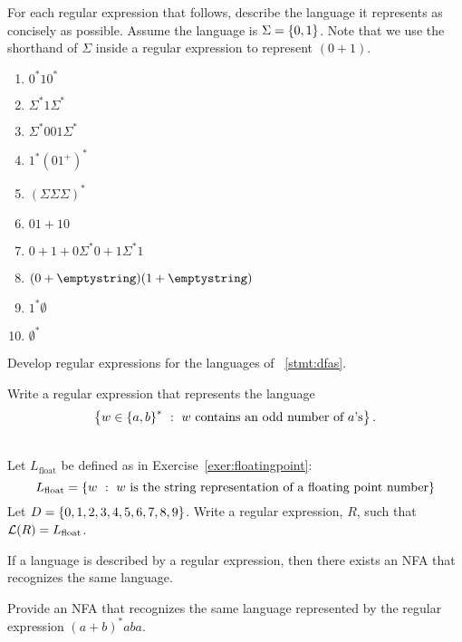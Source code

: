 \documentclass[twoside,letterpaper,openany]{book}
\begin{document}
\begin{exer2}
For each regular expression that follows, describe the language it represents as concisely as possible. Assume the language is $\Sigma = \left\lbrace 0, 1 \right\rbrace$. Note that we use the shorthand of $\Sigma$ inside a regular expression to represent $(0 + 1)$.
\begin{enumerate}
\item $0^*10^*$
\item $\Sigma^*1\Sigma^*$
\item $\Sigma^*001\Sigma^*$
\item $1^*(01^+)^*$
\item $(\Sigma\Sigma\Sigma)^*$
\item $01 + 10$
\item $0 + 1 + 0\Sigma^*0 + 1\Sigma^*1$
\item $(0 + \emptystring)(1 + \emptystring)$
\item $1^*\emptyset$
\item $\emptyset^*$
\end{enumerate}
\end{exer2}

\begin{exer2}
Develop regular expressions for the languages of \stmtword~\ref{stmt:dfas}.
\end{exer2}


\begin{exer1}
Write a regular expression that represents the language 
\[\left\lbrace w\in\left\lbrace a, b \right\rbrace^{*}\ :\ w~\textrm{contains an odd number of $a$'s} \right\rbrace.\]
\end{exer1}

\begin{exer1}
~\\Let $L_{\mathrm{float}}$ be defined as in Exercise~\ref{exer:floatingpoint}:
\[L_{\mathrm{float}} = \left\lbrace w\ :\ w~\textrm{is the string representation of a floating point number} \right\rbrace\]
Let $D = \left\lbrace 0, 1, 2, 3, 4, 5, 6, 7, 8, 9 \right\rbrace$. Write a regular expression, $R$, such that $\mathcal{L}(R) = L_{\mathrm{float}}$.
\end{exer1}

\begin{lemma2}
If a language is described by a regular expression, then there exists an NFA that recognizes the same language.
\end{lemma2}

\begin{exer1}
Provide an NFA that recognizes the same language represented by the regular expression $(a+b)^*aba$.
\end{exer1}
\end{document}
